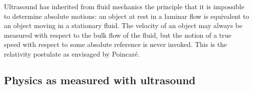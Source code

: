 \documentclass[10pt, fleqn,final,showtrims,oldfontcommands, article,a4paper,oneside]{memoir} %
\newcommand{\secref}[1]{section~\ref{sec:#1}}
\newcommand{\Poincare}{Poincar{\'e}}
\begin{document}
Ultrasound has inherited from fluid mechanics the principle that it is impossible to determine absolute motions:
an object at rest in a laminar flow is equivalent to an object moving in a stationary fluid.
The velocity of an object may always be measured with respect to the bulk flow of the fluid,
but the  notion of a true speed with respect to some absolute reference is never  invoked.
This is the relativity postulate as envisaged by \Poincare.







\subsection{Physics as measured with ultrasound}
\end{document}
